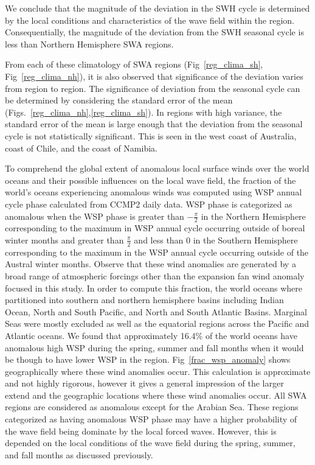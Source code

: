 \documentclass[draft,linenumbers]{agujournal2018}
\begin{document}
We conclude that the magnitude of the deviation in the SWH cycle is determined by the local conditions and characteristics of the wave field within the region. Consequentially, the magnitude of the deviation from the SWH seasonal cycle is less than Northern Hemisphere SWA regions.    

From each of these climatology of SWA regions (Fig~\ref{reg_clima_sh}, Fig~\ref{reg_clima_nh}), it is also observed that significance of the deviation varies from region to region. The significance of deviation from the seasonal cycle can be determined by considering the standard error of the mean (Figs.~\ref{reg_clima_nh},\ref{reg_clima_sh}). In regions with high variance, the standard error of the mean is large enough that the deviation from the seasonal cycle is not statistically significant. This is seen in the west coast of Australia, coast of Chile, and the coast of Namibia.  


To comprehend the global extent of anomalous local surface winds over the world oceans and their possible influences on the local wave field, the fraction of the world's oceans experiencing anomalous winds was computed using WSP annual cycle phase calculated from CCMP2 daily data. WSP phase is categorized as anomalous when the WSP phase is greater than $-\frac{\pi}{2}$ in the Northern Hemisphere corresponding to the maximum in WSP annual cycle occurring outside of boreal winter months and greater than $\frac{\pi}{2}$ and less than 0 in the Southern Hemisphere corresponding to the maximum in the WSP annual cycle occurring outside of the Austral winter months. Observe that these wind anomalies are generated by a broad range of atmospheric forcings other than the expansion fan wind anomaly focused in this study. In order to compute this fraction, the world oceans where partitioned into southern and northern hemisphere basins including Indian Ocean, North and South Pacific, and North and South Atlantic Basins. Marginal Seas were mostly excluded as well as the equatorial regions across the Pacific and Atlantic oceans. We found that approximately 16.4\% of the world oceans have anomalous high WSP during the spring, summer and fall  months when it would be though to have lower WSP in the region. Fig~\ref{frac_wsp_anomaly} shows geographically where these wind anomalies occur. This calculation is approximate and not highly rigorous, however it gives a general impression of the larger extend and the geographic locations where these wind anomalies occur. All SWA regions are considered as anomalous except for the Arabian Sea. These regions categorized as having anomalous WSP phase may have a higher probability of the wave field being dominate by the local forced waves. However, this is depended on the local conditions of the wave field during the spring, summer, and fall months as discussed previously. 
\end{document}
